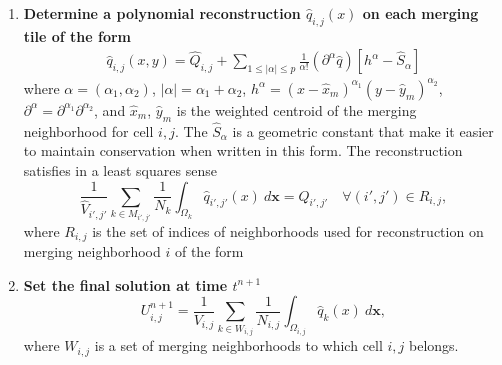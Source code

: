 \begin{enumerate}
\item \textbf{Determine a polynomial reconstruction $\hat q_{i,j}(x)$ on 
each merging tile of the form}
\begin{equation}\label{eq:q}
\begin{aligned}
    \hat q_{i,j} (x,y) = \widehat{Q}_{i,j} +  \sum_{1 \leq |\alpha| \leq p}  \frac{1}{\alpha!} (\partial^{\alpha} \hat q) [h^{\alpha}-\hat S_{\alpha}]
\end{aligned}
\end{equation}
where $\alpha = (\alpha_1, \alpha_2)$, $|\alpha| = \alpha_1 + \alpha_2$, $h^{\alpha} = (x-\hat x_m)^{\alpha_1}(y-\hat y_m)^{\alpha_2}$, $\partial^{\alpha} = \partial^{\alpha_1}\partial^{\alpha_2}$,
and $\hat x_m$, $\hat y_m$ is the weighted centroid of the merging
neighborhood for cell $i,j$. 
The $ \hat S_{\alpha}$ is a geometric
constant that make it easier to maintain conservation when written in
this form.  The reconstruction satisfies in a least squares sense
\begin{equation}\label{eq:qi}
\frac{1}{\hat{V}_{i',j'}}\sum_{k \in M_{i',j'}}\frac{1}{N_{k}}\int_{\Omega_{k}} \hat q_{i',j'}(x)~d\mathbf{x} = \hat Q_{i',j'} \quad \forall (i',j') \in R_{i,j},
\end{equation}
where $R_{i,j}$ is the set of indices of neighborhoods used for reconstruction 
on merging neighborhood $i$ of the form


\item \textbf{Set the final solution at time $t^{n+1}$}
	\begin{equation}\label{eq:final_update}
	U^{n+1}_{i,j} =  \frac{1}{V_{i,j}}\sum_{k \in W_{i,j}}\frac{1}{N_{i,j}}\int_{\Omega_{i,j}} \hat q_{k}(x)~d\mathbf{x} ,
	\end{equation}
	where $W_{i,j}$ is a set of merging neighborhoods to which cell $i,j$ belongs.
\end{enumerate}


